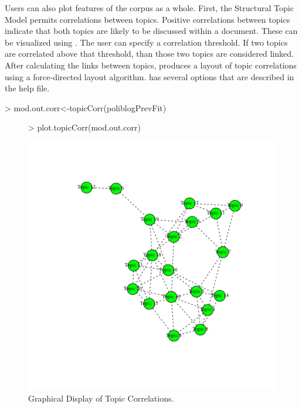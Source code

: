 \documentclass[nojss]{jss}
\begin{document}
Users can also plot features of the corpus as a whole. First, the Structural Topic Model permits correlations between topics. Positive correlations between topics indicate that both topics are likely to be discussed within a document. These can be visualized using . The user can specify a correlation threshold.  If two topics are correlated above that threshold, than those two topics are considered linked.  After calculating the links between topics,  produces a layout of topic correlations using a force-directed layout algorithm.  has several options that are described in the help file.

\begin{Schunk}
\begin{Sinput}
> mod.out.corr<-topicCorr(poliblogPrevFit)
\end{Sinput}
\end{Schunk}

\begin{figure}[t!]
\begin{center}
\begin{Schunk}
\begin{Sinput}
> plot.topicCorr(mod.out.corr)
\end{Sinput}
\end{Schunk}
\includegraphics{stmVignette-025}
\caption{Graphical Display of Topic Correlations.}
\label{fig:correlations}
\end{center}
\end{figure}
\end{document}
